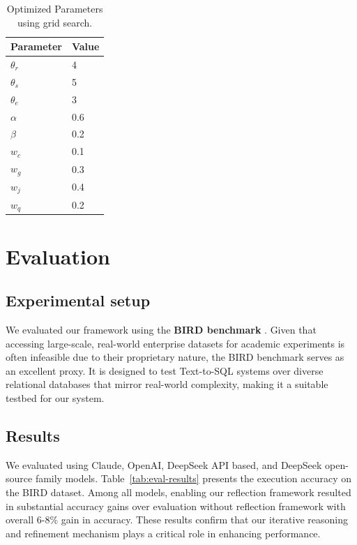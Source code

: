 \documentclass[runningheads]{llncs}
\begin{document}
\begin{table}[ht]
\caption{Optimized Parameters using grid search.}\label{tab:optimized-params}
\centering
\begin{tabular}{ll}
\toprule
\textbf{Parameter} & \textbf{Value} \\
\midrule
$\theta_r$ & 4 \\
$\theta_s$ & 5 \\
$\theta_e$ & 3 \\
$\alpha$   & 0.6 \\
$\beta$    & 0.2 \\
$w_c$      & 0.1 \\
$w_g$      & 0.3 \\
$w_j$      & 0.4 \\
$w_q$      & 0.2 \\
\bottomrule
\end{tabular}
\end{table}

\section{Evaluation}
\subsection{Experimental setup}

We evaluated our framework using the \textbf{BIRD benchmark} \cite{li2023bird}. Given that accessing large-scale, real-world enterprise datasets for academic experiments is often infeasible due to their proprietary nature, the BIRD benchmark serves as an excellent proxy. It is designed to test Text-to-SQL systems over diverse relational databases that mirror real-world complexity, making it a suitable testbed for our system.

\subsection{Results}
\label{subsec:auto-eval}
We evaluated using Claude, OpenAI, DeepSeek API based, and DeepSeek open-source family models. Table~\ref{tab:eval-results} presents the execution accuracy on the BIRD dataset. Among all models, enabling our reflection framework resulted in substantial accuracy gains over evaluation without reflection framework with overall 6-8\% gain in accuracy. These results confirm that our iterative reasoning and refinement mechanism plays a critical role in enhancing performance.
\end{document}
